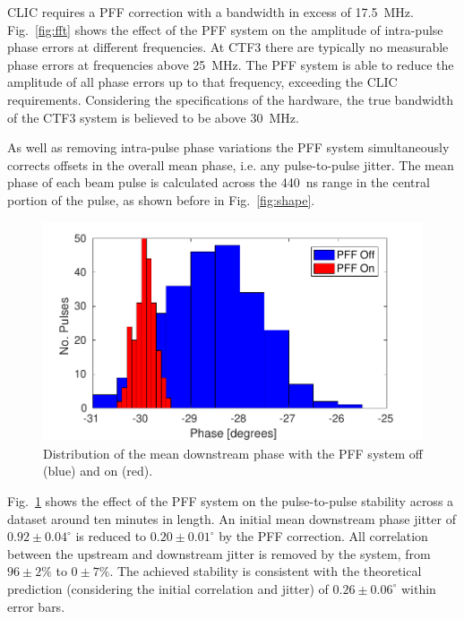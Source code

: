 \documentclass[%
 reprint,
superscriptaddress,
 amsmath,amssymb,
 prl,
]{revtex4-1}
\begin{document}
CLIC requires a PFF correction with a bandwidth in excess of 17.5~MHz. 
Fig.~\ref{fig:fft} shows the effect of the PFF system on the amplitude of 
intra-pulse phase errors at different frequencies. At CTF3 there are typically 
no measurable phase errors at frequencies above 25~MHz. The PFF system is able 
to reduce the amplitude of all phase errors up to that frequency, exceeding the 
CLIC requirements. Considering the specifications of the hardware, the true 
bandwidth of the CTF3 system is believed to be above 30~MHz.




As well as removing intra-pulse phase variations the PFF system simultaneously 
corrects offsets in the overall mean phase, i.e. any pulse-to-pulse jitter. The 
mean phase of each beam pulse is calculated across the 440~ns range in the 
central portion of the pulse, as shown before in Fig.~\ref{fig:shape}.

\begin{figure}
	\includegraphics[width=\columnwidth]{figs/meanJit}%
	\caption{\label{fig:meanJit}Distribution of the mean downstream phase with 
		the 
		PFF system off (blue) and on (red).}
\end{figure}

Fig.~\ref{fig:meanJit} shows the effect of the PFF system on the pulse-to-pulse 
stability across a dataset around ten minutes in length. An 
initial mean downstream phase jitter of \(0.92\pm0.04^\circ\) is reduced to \(0.20\pm0.01^\circ\) by the PFF 
correction. All correlation between the upstream and downstream jitter is 
removed by the system, from 
\(96\pm2\%\) to \(0\pm7\%\). The achieved stability is consistent with the theoretical prediction (considering the initial correlation and jitter) of \(0.26\pm0.06^\circ\) within error bars.
\end{document}
